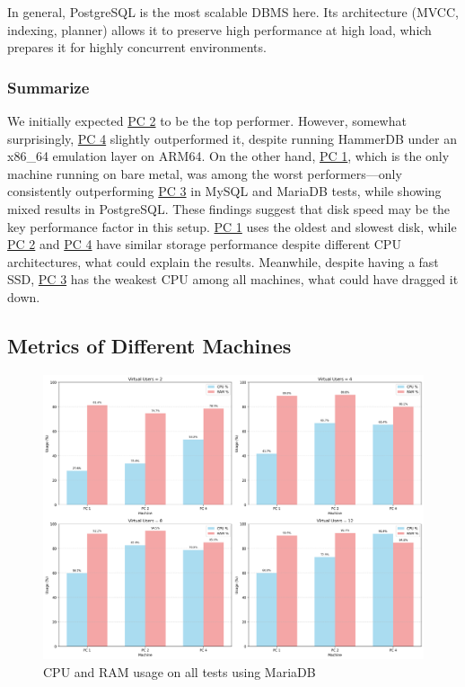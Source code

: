 In general, PostgreSQL is the most scalable DBMS here. Its architecture (MVCC, indexing, planner) allows it to preserve high performance at high load, which prepares it for highly concurrent environments.

\vspace{2cm}

\subsubsection{Summarize}

We initially expected \hyperref[tab:hardware-setup]{PC 2} to be the top performer. However, somewhat surprisingly, \hyperref[tab:hardware-setup]{PC 4} slightly outperformed it, despite running HammerDB under an x86\_64 emulation layer on ARM64. On the other hand, \hyperref[tab:hardware-setup]{PC 1}, which is the only machine running on bare metal, was among the worst performers—only consistently outperforming \hyperref[tab:hardware-setup]{PC 3} in MySQL and MariaDB tests, while showing mixed results in PostgreSQL. These findings suggest that disk speed may be the key performance factor in this setup. \hyperref[tab:hardware-setup]{PC 1} uses the oldest and slowest disk, while \hyperref[tab:hardware-setup]{PC 2} and \hyperref[tab:hardware-setup]{PC 4} have similar storage performance despite different CPU architectures, what could explain the results. Meanwhile, despite having a fast SSD, \hyperref[tab:hardware-setup]{PC 3} has the weakest CPU among all machines, what could have dragged it down.

\subsection{Metrics of Different Machines}

\begin{figure}[H]
    \centering
    \includegraphics[width=0.87\linewidth]{Images/sys_usage_mariadb_time_ranges_filtered.png}
    \caption{CPU and RAM usage on all tests using MariaDB}
    \label{fig:mariadb-cpu-ram}
\end{figure}


